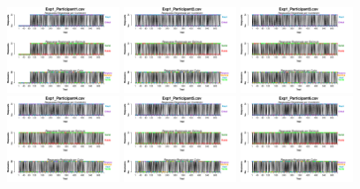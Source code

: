 \begin{itemize}
\begin{figure}[th]
\centering
\includegraphics[width=0.30\textwidth]{Figures/BiasResp_Exp1_P1} \includegraphics[width=0.30\textwidth]{Figures/BiasResp_Exp1_P2} \includegraphics[width=0.30\textwidth]{Figures/BiasResp_Exp1_P3}
\includegraphics[width=0.30\textwidth]{Figures/BiasResp_Exp1_P4} \includegraphics[width=0.30\textwidth]{Figures/BiasResp_Exp1_P5} \includegraphics[width=0.30\textwidth]{Figures/BiasResp_Exp1_P6}

\end{figure}
\end{itemize}
